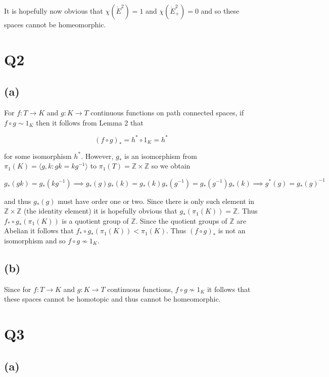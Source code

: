 \documentclass{article}
\begin{document}
It is hopefully now obvious that $\chi(\mathring{E}^2) = 1$ and $\chi(\mathring{E}^2_+) = 0$ 
and so these spaces cannot be homeomorphic.

\section*{Q2}
\subsection*{(a)}
For $f:T \rightarrow K$ and $g:K\rightarrow T$ continuous functions on path connected spaces, if $f \circ g \sim 1_K$ 
then it follows from Lemma 2 that  

\begin{equation*}
    (f\circ g)_* = h^* \circ 1_K = h^*
\end{equation*}

for some isomorphism $h^*$. However, $g_*$ is an isomorphism from $\pi_1(K) = \langle g,k:gk = kg^{-1} \rangle$ to $\pi_1(T) = \mathbb{Z}\times \mathbb{Z}$ 
so we obtain 

\begin{equation*}
    g_*(gk) = g_*(kg^{-1}) \implies g_*(g)g_*(k) = g_*(k)g_*(g^{-1}) = g_*(g^{-1})g_*(k) \implies g^*(g) = g_*(g)^{-1}
\end{equation*}

and thus $g_*(g)$ must have order one or two. Since there is only such element in $\mathbb{Z} \times \mathbb{Z}$ (the 
identity element) it is hopefully obvious that $g_*(\pi_1(K)) = \mathbb{Z}$. Thus $f_*\circ g_*(\pi_1(K))$ is a 
quotient group of $\mathbb{Z}$. Since the quotient groups of $\mathbb{Z}$ are Abelian it follows 
that $f_*\circ g_*(\pi_1(K)) < \pi_1(K)$. Thus $(f \circ g)_*$ is not an isomorphism and so $f \circ g \nsim 1_K$.

\subsection*{(b)}
Since for $f:T \rightarrow K$ and $g:K\rightarrow T$ continuous functions, $f \circ g \nsim 1_K$ 
it follows that these spaces cannot be homotopic and thus cannot be homeomorphic.

\section*{Q3}
\subsection*{(a)}
\end{document}
